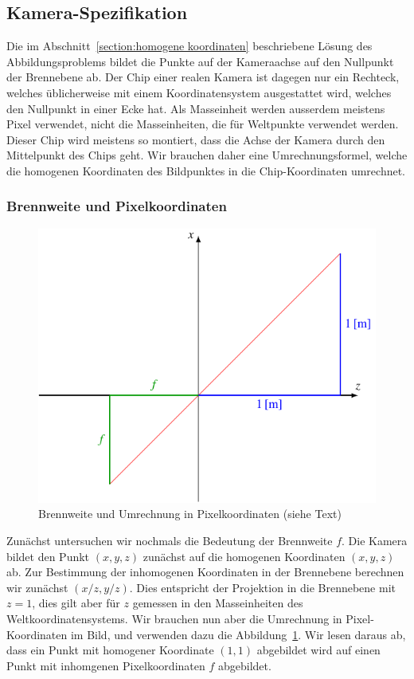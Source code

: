 %
%
%
\subsection{Kamera-Spezifikation\label{section:kameraspez}}
Die im Abschnitt~\ref{section:homogene koordinaten} beschriebene
Lösung des Abbildungsproblems bildet die Punkte auf der Kameraachse
auf den Nullpunkt der Brennebene ab.
Der Chip einer realen Kamera ist dagegen nur ein Rechteck, 
welches üblicherweise mit einem Koordinatensystem ausgestattet wird,
welches den Nullpunkt in einer Ecke hat.
Als Masseinheit werden ausserdem meistens Pixel verwendet, nicht die
Masseinheiten, die für Weltpunkte verwendet werden.
Dieser Chip wird meistens so montiert, dass die Achse der Kamera
durch den Mittelpunkt des Chips geht.
Wir brauchen daher eine Umrechnungsformel, welche die homogenen
Koordinaten des Bildpunktes in die Chip-Koordinaten umrechnet.

\subsubsection{Brennweite und Pixelkoordinaten}
\begin{figure}
\centering
\includegraphics{applications/kamera/brennweite.pdf}
\caption{Brennweite und Umrechnung in Pixelkoordinaten (siehe Text)
\label{skript:kamera:brennweite}}
\end{figure}
Zunächst untersuchen wir nochmals die Bedeutung der Brennweite $f$.
Die Kamera bildet den Punkt $(x,y,z)$ zunächst auf die homogenen
Koordinaten $(x,y,z)$ ab.
Zur Bestimmung der inhomogenen Koordinaten in der Brennebene 
berechnen wir zunächst $(x/z, y/z)$.
Dies entspricht der Projektion in die Brennebene mit $z=1$,
dies gilt aber für $z$ gemessen in den Masseinheiten des
Weltkoordinatensystems.
Wir brauchen nun aber die Umrechnung in Pixel-Koordinaten im Bild,
und verwenden dazu die Abbildung~\ref{skript:kamera:brennweite}.
Wir lesen daraus ab, dass ein Punkt mit homogener Koordinate $(1,1)$
abgebildet wird auf einen Punkt mit inhomgenen Pixelkoordinaten $f$
abgebildet.

